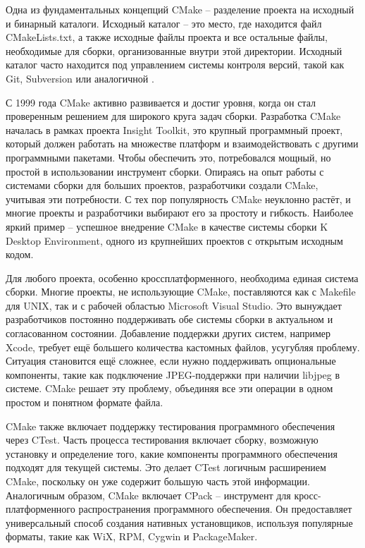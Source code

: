 Одна из фундаментальных концепций CMake -- разделение проекта на исходный и бинарный каталоги. Исходный каталог -- это место, где находится файл CMakeLists.txt, а также исходные файлы проекта и все остальные файлы, необходимые для сборки, организованные внутри этой директории. Исходный каталог часто находится под управлением системы контроля версий, такой как Git, Subversion или аналогичной \cite{Professional_CMake}.

С 1999 года CMake активно развивается и достиг уровня, когда он стал проверенным решением для широкого круга задач сборки. Разработка CMake началась в рамках проекта Insight Toolkit, это крупный программный проект, который должен работать на множестве платформ и взаимодействовать с другими программными пакетами. Чтобы обеспечить это, потребовался мощный, но простой в использовании инструмент сборки. Опираясь на опыт работы с системами сборки для больших проектов, разработчики создали CMake, учитывая эти потребности. С тех пор популярность CMake неуклонно растёт, и многие проекты и разработчики выбирают его за простоту и гибкость. Наиболее яркий пример -- успешное внедрение CMake в качестве системы сборки K Desktop Environment, одного из крупнейших проектов с открытым исходным кодом.

Для любого проекта, особенно кроссплатформенного, необходима единая система сборки. Многие проекты, не использующие CMake, поставляются как с Makefile для UNIX, так и с рабочей областью Microsoft Visual Studio. Это вынуждает разработчиков постоянно поддерживать обе системы сборки в актуальном и согласованном состоянии. Добавление поддержки других систем, например Xcode, требует ещё большего количества кастомных файлов, усугубляя проблему. Ситуация становится ещё сложнее, если нужно поддерживать опциональные компоненты, такие как подключение JPEG-поддержки при наличии libjpeg в системе. CMake решает эту проблему, объединяя все эти операции в одном простом и понятном формате файла.

CMake также включает поддержку тестирования программного обеспечения через CTest. Часть процесса тестирования включает сборку, возможную установку и определение того, какие компоненты программного обеспечения подходят для текущей системы. Это делает CTest логичным расширением CMake, поскольку он уже содержит большую часть этой информации. Аналогичным образом, CMake включает CPack -- инструмент для кросс-платформенного распространения программного обеспечения. Он предоставляет универсальный способ создания нативных установщиков, используя популярные форматы, такие как WiX, RPM, Cygwin и PackageMaker.

